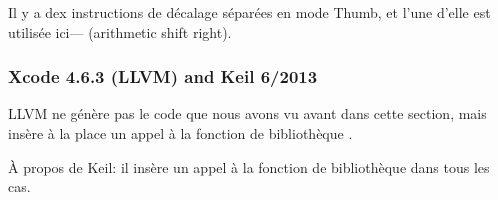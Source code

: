 
Il y a dex instructions de décalage séparées en mode Thumb, et l'une d'elle est
utilisée ici--- (arithmetic shift right).

\subsubsection{\NonOptimizing Xcode 4.6.3 (LLVM) and Keil 6/2013}

LLVM \NonOptimizing
ne génère pas le code que nous avons vu avant dans cette section, mais insère à la
place un appel à la fonction de bibliothèque .

À propos de Keil: il insère un appel à la fonction de bibliothèque 
dans tous les cas.

